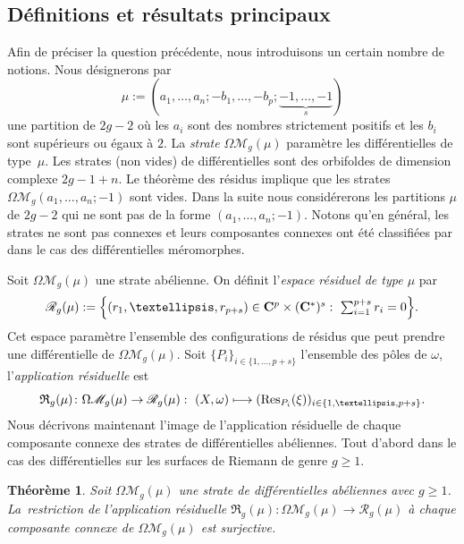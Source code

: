 \documentclass[11pt]{article}
\numberwithin{equation}{section}\renewcommand{\proofname}{Démonstration}
\let\mathcal\mathscr
\newcommand\mto{\mathchoice{\longmapsto}{\mapsto}{\mapsto}{\mapsto}}
\newcommand{\CC}{\mathbf{C}}
\newcommand\Res{\operatorname{Res}}
\newcommand{\appres}[1][g]{\mathfrak{R}_{#1}}
\newcommand{\espres}[1][g]{\mathcal{R}_{#1}}
\newcommand{\omoduli}[1][g]{{\Omega\mathcal M}_{\!#1}}
\newtheorem{thm}{Théorème}[section]
\theoremstyle{definition}
\begin{document}
\subsection{Définitions et résultats principaux}
Afin de préciser la question précédente, nous introduisons un certain nombre de notions. Nous désignerons par
\[
\mu:=(a_{1},\dots,a_{n};-b_{1},\dots,-b_{p};\underbrace{-1,\dots,-1}_{s})\] une partition de $2g-2$ où les $a_{i}$ sont des nombres strictement positifs et les $b_{i}$ sont supérieurs ou égaux à $2$.
La \emph{strate} $\omoduli(\mu)$ paramètre les différentielles de type~$\mu$. Les strates (non vides) de différentielles sont des orbifoldes de dimension complexe $2g-1+n$.
Le théorème des résidus implique que les strates $\omoduli(a_{1},\dots,a_{n};-1)$ sont vides. Dans la suite nous considérerons les partitions $\mu$ de $2g-2$ qui ne sont pas de la forme $(a_{1},\dots,a_{n};-1)$. Notons qu'en général, les strates ne sont pas connexes et leurs composantes connexes ont été classifiées par \cite{Bo} dans le cas des différentielles méromorphes.

Soit $\omoduli(\mu)$ une strate abélienne. On définit l'\emph{espace résiduel de type $\mu$} par
\begin{equation}\textstyle
\espres(\mu) := \Bigl\{ (r_{1},\dots,r_{p+s})\in \CC^{p}\times(\CC^{\ast})^{s}:\ \sum_{i=1}^{p+s} r_{i}=0 \Bigr\}.
\end{equation}
Cet espace paramètre l'ensemble des configurations de résidus que peut prendre une différentielle de $\omoduli(\mu)$.
Soit $\{P_{i}\}_{i\in\{1,\dots,p+s \}}$ l'ensemble des pôles de $\omega$, l'\emph{application résiduelle} est
\begin{equation}
\appres(\mu) \colon \omoduli(\mu) \to \espres(\mu):\ (X,\omega) \mto (\Res_{P_{i}}(\xi))_{i \in \{1,\dots,p+s\} }.
\end{equation}
Nous décrivons maintenant l'image de l'application résiduelle de chaque composante connexe des strates de différentielles abéliennes. Tout d'abord dans le cas des différentielles sur les surfaces de Riemann de genre $g\geq1$.
\begin{thm}\label{thm:ggeq1abel}
Soit $\omoduli(\mu)$ une strate de différentielles abéliennes avec $g\geq1$. La~restriction de l'application résiduelle $\appres(\mu)\colon\omoduli(\mu) \to \espres(\mu)$ à chaque composante connexe de $\omoduli(\mu)$ est surjective.
\end{thm}
\end{document}
